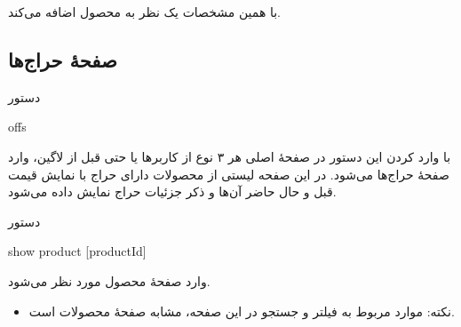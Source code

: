 \documentclass[]{article}
\begin{document}
با همین مشخصات یک نظر به محصول اضافه می‌کند.

\newpage

\subsection*{{\titr صفحهٔ حراج‌ها}}


\begin{mybox}[colback=yellow]{دستور}

\begin{latin}

offs

\end{latin}

\end{mybox}

با وارد کردن این دستور در صفحهٔ اصلی هر ۳ نوع از کاربرها یا حتی قبل از لاگین، وارد صفحهٔ حراج‌ها می‌شود. در این صفحه لیستی از محصولات دارای حراج با نمایش قیمت قبل و حال حاضر آن‌ها و ذکر جزئیات حراج نمایش داده می‌شود.


\hrulefill

\begin{mybox}[colback=yellow]{دستور}

\begin{latin}

show product [productId]

\end{latin}

\end{mybox}

وارد صفحهٔ محصول مورد نظر می‌شود.


\hrulefill

\begin{itemize}[label={$\blacksquare$}]
\item
نکته: موارد مربوط به فیلتر و جستجو در این صفحه، مشابه صفحهٔ محصولات است.

\end{itemize}
\end{document}
